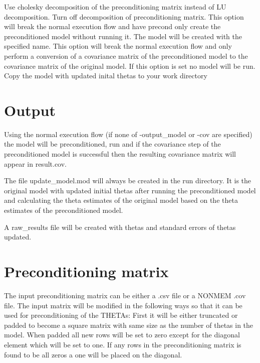 \begin{optionlist}
Use cholesky decomposition of the preconditioning matrix instead of LU decomposition.
Turn off decomposition of preconditioning matrix.
This option will break the normal execution flow and have precond only create the preconditioned model without running it.
The model will be created with the specified name.
This option will break the normal execution flow and only perform a conversion of a covariance matrix of the preconditioned model to the covariance matrix of the original model.
If this option is set no model will be run.
Copy the model with updated inital thetas to your work directory
\end{optionlist}

\section{Output}

Using the normal execution flow (if none of -output\_model or -cov are specified) the model will be preconditioned, run and if the covariance step of the preconditioned model is successful then the resulting covariance matrix will appear in result.cov.

The file update\_model.mod will always be created in the run directory. It is the original model with updated initial thetas after
running the preconditioned model and calculating the theta estimates of the original model based on the theta estimates of the preconditioned model.

A raw\_results file will be created with thetas and standard errors of thetas updated. 

\section{Preconditioning matrix}

The input preconditioning matrix can be either a .csv file or a NONMEM .cov file. The input matrix will be modified in the following ways so that it can be used for preconditioning of the THETAs:
First it will be either truncated or padded to become a square matrix with same size as the number of thetas in the model.
When padded all new rows will be set to zero except for the diagonal element which will be set to one. If any rows in the preconditioning matrix is found
to be all zeros a one will be placed on the diagonal.

